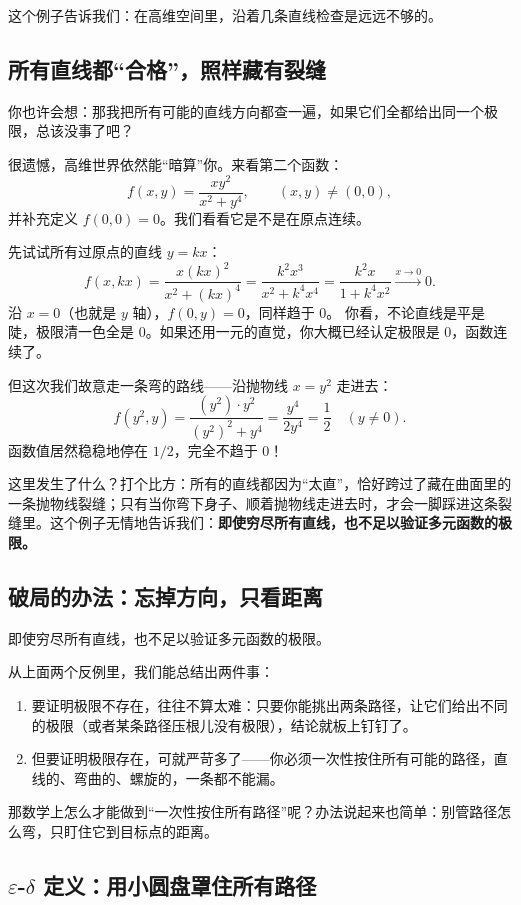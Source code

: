 这个例子告诉我们：在高维空间里，沿着几条直线检查是远远不够的。

\subsection{所有直线都``合格''，照样藏有裂缝}

你也许会想：那我把所有可能的直线方向都查一遍，如果它们全都给出同一个极限，总该没事了吧？

很遗憾，高维世界依然能``暗算''你。来看第二个函数：
\[
f(x,y)=\frac{xy^2}{x^2+y^4},\qquad (x,y)\neq(0,0),
\]
并补充定义 \(f(0,0)=0\)。我们看看它是不是在原点连续。

先试试所有过原点的直线 \(y=kx\)：
\[
f(x,kx)=\frac{x(kx)^2}{x^2+(kx)^4}=\frac{k^2 x^3}{x^2+k^4x^4}=\frac{k^2 x}{1+k^4x^2}\xrightarrow{x\to 0} 0.
\]
沿 \(x=0\)（也就是 \(y\) 轴），\(f(0,y)=0\)，同样趋于 \(0\)。  
你看，不论直线是平是陡，极限清一色全是 \(0\)。如果还用一元的直觉，你大概已经认定极限是 \(0\)，函数连续了。

但这次我们故意走一条弯的路线——沿抛物线 \(x = y^2\) 走进去：
\[
f(y^2,y)=\frac{(y^2)\cdot y^2}{(y^2)^2+y^4}=\frac{y^4}{2y^4}=\frac{1}{2}\quad (y\neq0).
\]
函数值居然稳稳地停在 \(1/2\)，完全不趋于 \(0\)！

这里发生了什么？打个比方：所有的直线都因为``太直''，恰好跨过了藏在曲面里的一条抛物线裂缝；只有当你弯下身子、顺着抛物线走进去时，才会一脚踩进这条裂缝里。这个例子无情地告诉我们：\textbf{即使穷尽所有直线，也不足以验证多元函数的极限。}

\subsection{破局的办法：忘掉方向，只看距离}即使穷尽所有直线，也不足以验证多元函数的极限。

从上面两个反例里，我们能总结出两件事：
\begin{enumerate}
    \item 要证明极限不存在，往往不算太难：只要你能挑出两条路径，让它们给出不同的极限（或者某条路径压根儿没有极限），结论就板上钉钉了。
    \item 但要证明极限存在，可就严苛多了——你必须一次性按住所有可能的路径，直线的、弯曲的、螺旋的，一条都不能漏。
\end{enumerate}

那数学上怎么才能做到``一次性按住所有路径''呢？办法说起来也简单：别管路径怎么弯，只盯住它到目标点的距离。

\subsection{\texorpdfstring{\(\varepsilon\)-\(\delta\)}{ε-δ} 定义：用小圆盘罩住所有路径}

